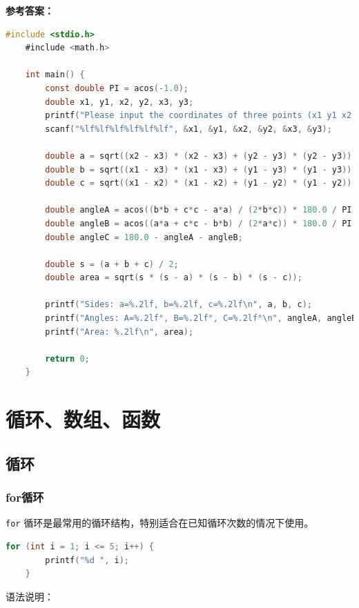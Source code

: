 \documentclass[lang=cn,newtx,10pt,scheme=chinese]{elegantbook}
\begin{document}
\newpage

\textbf{参考答案：}

\begin{lstlisting}[language=C]
    #include <stdio.h>
    #include <math.h>

    int main() {
        const double PI = acos(-1.0);
        double x1, y1, x2, y2, x3, y3;
        printf("Please input the coordinates of three points (x1 y1 x2 y2 x3 y3):");
        scanf("%lf%lf%lf%lf%lf%lf", &x1, &y1, &x2, &y2, &x3, &y3);

        double a = sqrt((x2 - x3) * (x2 - x3) + (y2 - y3) * (y2 - y3));
        double b = sqrt((x1 - x3) * (x1 - x3) + (y1 - y3) * (y1 - y3));
        double c = sqrt((x1 - x2) * (x1 - x2) + (y1 - y2) * (y1 - y2));

        double angleA = acos((b*b + c*c - a*a) / (2*b*c)) * 180.0 / PI;
        double angleB = acos((a*a + c*c - b*b) / (2*a*c)) * 180.0 / PI;
        double angleC = 180.0 - angleA - angleB;

        double s = (a + b + c) / 2;
        double area = sqrt(s * (s - a) * (s - b) * (s - c));

        printf("Sides: a=%.2lf, b=%.2lf, c=%.2lf\n", a, b, c);
        printf("Angles: A=%.2lf°, B=%.2lf°, C=%.2lf°\n", angleA, angleB, angleC);
        printf("Area: %.2lf\n", area);

        return 0;
    }
\end{lstlisting}

\chapter{循环、数组、函数}

\section{循环}

\subsection{for循环}

\lstinline{for} 循环是最常用的循环结构，特别适合在已知循环次数的情况下使用。

\begin{lstlisting}[language=C]
    for (int i = 1; i <= 5; i++) {
        printf("%d ", i);
    }
\end{lstlisting}

语法说明：
\end{document}
